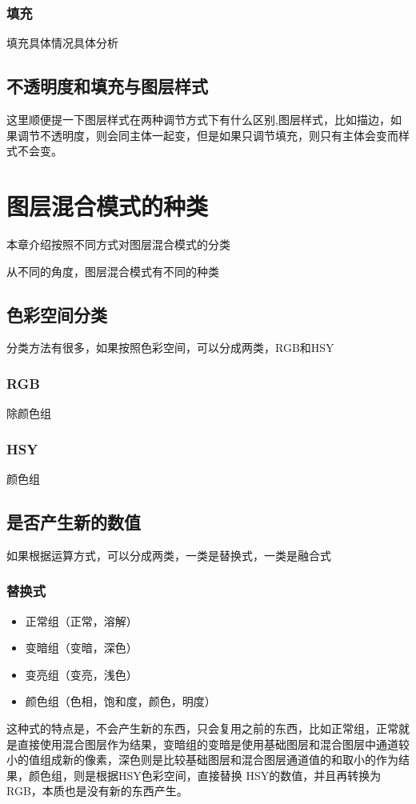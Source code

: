 \subsection{填充}
填充具体情况具体分析
\section{不透明度和填充与图层样式}
这里顺便提一下图层样式在两种调节方式下有什么区别,图层样式，比如描边，如果调节不透明度，则会同主体一起变，但是如果只调节填充，则只有主体会变而样式不会变。
\chapter{图层混合模式的种类}
\begin{introduction}
	\item  本章介绍按照不同方式对图层混合模式的分类
	\item  从不同的角度，图层混合模式有不同的种类
\end{introduction}
\section{ 色彩空间分类}
分类方法有很多，如果按照色彩空间，可以分成两类，RGB和HSY
\subsection{ RGB}
除颜色组
\subsection{ HSY}
颜色组
\section{ 是否产生新的数值}
如果根据运算方式，可以分成两类，一类是替换式，一类是融合式
\subsection{ 替换式}
\begin{itemize}
	\item  正常组（正常，溶解）
	\item 变暗组（变暗，深色）
	\item 变亮组（变亮，浅色）
	\item 颜色组（色相，饱和度，颜色，明度）
\end{itemize}
\begin{notice}
\item 这种式的特点是，不会产生新的东西，只会复用之前的东西，比如正常组，正常就是直接使用混合图层作为结果，变暗组的变暗是使用基础图层和混合图层中通道较小的值组成新的像素，深色则是比较基础图层和混合图层通道值的和取小的作为结果，颜色组，则是根据HSY色彩空间，直接替换 HSY的数值，并且再转换为RGB，本质也是没有新的东西产生。
\end{notice}

